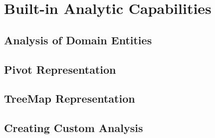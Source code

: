 \chapter{Built-in Analytic Capabilities}\label{ch:06}

\section{Analysis of Domain Entities}

\section{Pivot Representation}

\section{TreeMap Representation}

\section{Creating Custom Analysis}